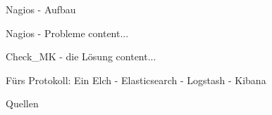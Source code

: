 \documentclass[11pt]{beamer}
\begin{document}
\begin{frame}{Nagios - Aufbau}
	
\end{frame}
\begin{frame}{Nagios - Probleme}
	content...
\end{frame}
\begin{frame}{Check\_MK - die Lösung}
	content...
\end{frame}
\begin{frame}{Fürs Protokoll: Ein Elch - Elasticsearch - Logstash - Kibana}

\end{frame}
\begin{frame}{Quellen}
	\printbibliography
\end{frame}
\end{document}
